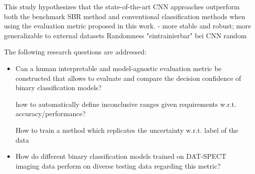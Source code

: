 This study hypothesizes that the state-of-the-art CNN approaches outperform both the benchmark SBR method and conventional 
classification methods when using the evaluation metric proposed in this work.
- more stable and robust; more generalizable to external datasets
Randomness "eintrainierbar" bei CNN random

The following research questions are addressed: 
\begin{itemize}
    \item Can a human interpretable and model-agnostic evaluation metric be constructed that allows 
    to evaluate and compare the decision confidence of binary classification models?

    how to automatically define inconclusive ranges given requirements w.r.t. accuracy/performance?

    How to train a method which replicates the uncertainty w.r.t. label of the data

    \item How do different binary classification models trained on DAT-SPECT imaging data perform on 
    diverse testing data regarding this metric? 

\end{itemize}




